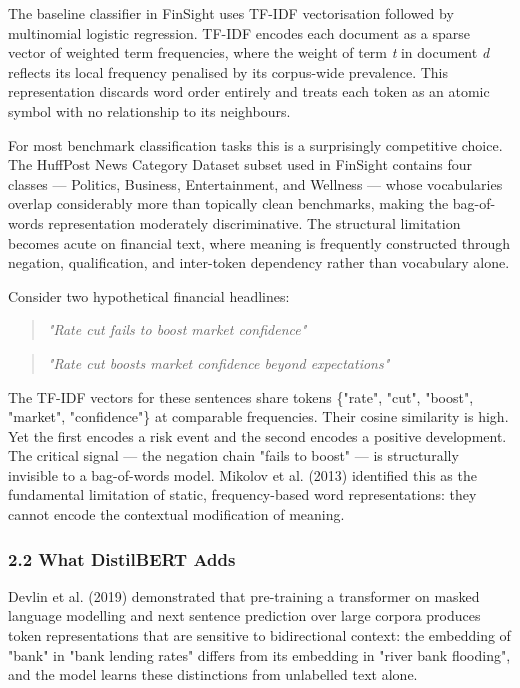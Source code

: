 \documentclass[11pt,a4paper]{article}
\begin{document}
The baseline classifier in FinSight uses TF-IDF vectorisation followed by multinomial logistic regression. TF-IDF encodes each document as a sparse vector of weighted term frequencies, where the weight of term \textit{t} in document \textit{d} reflects its local frequency penalised by its corpus-wide prevalence. This representation discards word order entirely and treats each token as an atomic symbol with no relationship to its neighbours.

For most benchmark classification tasks this is a surprisingly competitive choice. The HuffPost News Category Dataset subset used in FinSight contains four classes — Politics, Business, Entertainment, and Wellness — whose vocabularies overlap considerably more than topically clean benchmarks, making the bag-of-words representation moderately discriminative. The structural limitation becomes acute on financial text, where meaning is frequently constructed through negation, qualification, and inter-token dependency rather than vocabulary alone.

Consider two hypothetical financial headlines:

\begin{quote}\textit{\textit{"Rate cut fails to boost market confidence"}}\end{quote}
\begin{quote}\textit{\textit{"Rate cut boosts market confidence beyond expectations"}}\end{quote}

The TF-IDF vectors for these sentences share tokens \{"rate", "cut", "boost", "market", "confidence"\} at comparable frequencies. Their cosine similarity is high. Yet the first encodes a risk event and the second encodes a positive development. The critical signal — the negation chain "fails to boost" — is structurally invisible to a bag-of-words model. Mikolov et al. (2013) identified this as the fundamental limitation of static, frequency-based word representations: they cannot encode the contextual modification of meaning.

\subsubsection*{2.2 What DistilBERT Adds}

Devlin et al. (2019) demonstrated that pre-training a transformer on masked language modelling and next sentence prediction over large corpora produces token representations that are sensitive to bidirectional context: the embedding of "bank" in "bank lending rates" differs from its embedding in "river bank flooding", and the model learns these distinctions from unlabelled text alone.
\end{document}
